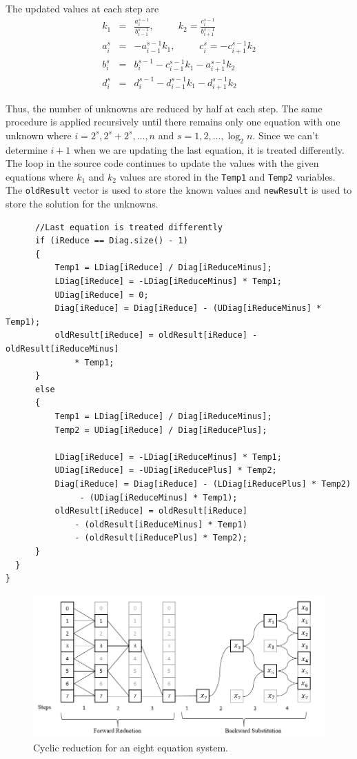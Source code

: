 \documentclass[12pt, oneside]{book}
\theoremstyle{plain}
\theoremstyle{definition}
\begin{document}
The updated values at each step are 
\begin{eqnarray}
k_1 &=& \frac{ a_{i}^{s - 1}}{b_{i-1}^{s - 1}}, \hspace{30pt} k_2 = \frac{ c_{i}^{s - 1}}{b_{i+1}^{s - 1}} \\
a_i^{s} &=& -a_{i-1}^{s - 1}  k_1, \hspace{30pt} c_i^{s} = -c_{i+1}^{s - 1}  k_2\\
b_i^{s} &=& b_{i}^{s - 1} -c_{i-1}^{s - 1} k_1 - a_{i+1}^{s - 1}  k_2  \\
d_i^{s} &=& d_i^{s - 1} - d_{i- 1}^{s - 1}  k_1 - d_{i + 1}^{s - 1}   k_2
\end{eqnarray}

Thus, the number of unknowns are reduced by half at each step. The same procedure is applied recursively until there remains only one equation with one unknown where $ i = 2^s, 2^s + 2^s, ... , n$ and $s = 1, 2, ... , \log_2 n$. Since we can't determine $i + 1$ when we are updating the last equation, it is treated differently. The loop in the source code continues to update the values with the given equations where $k_1$ and $k_2$ values are stored in the \verb!Temp1! and \verb!Temp2! variables. The \verb!oldResult! vector is used to store the known values and \verb!newResult! is used to store the solution for the unknowns.
\begin{verbatim}
      //Last equation is treated differently
      if (iReduce == Diag.size() - 1)
      {
          Temp1 = LDiag[iReduce] / Diag[iReduceMinus];
          LDiag[iReduce] = -LDiag[iReduceMinus] * Temp1;
          UDiag[iReduce] = 0;
          Diag[iReduce] = Diag[iReduce] - (UDiag[iReduceMinus] * Temp1);
          oldResult[iReduce] = oldResult[iReduce] - oldResult[iReduceMinus]
              * Temp1;
      }
      else
      {
          Temp1 = LDiag[iReduce] / Diag[iReduceMinus];
          Temp2 = UDiag[iReduce] / Diag[iReducePlus];

          LDiag[iReduce] = -LDiag[iReduceMinus] * Temp1;
          UDiag[iReduce] = -UDiag[iReducePlus] * Temp2;
          Diag[iReduce] = Diag[iReduce] - (LDiag[iReducePlus] * Temp2)
               - (UDiag[iReduceMinus] * Temp1);
          oldResult[iReduce] = oldResult[iReduce]
              - (oldResult[iReduceMinus] * Temp1)
              - (oldResult[iReducePlus] * Temp2);
      }
  }
}
\end{verbatim}
\begin{figure}[!htb]
    \centering
        \includegraphics[scale=0.7]{cyclic.png}
    \caption{Cyclic reduction for an eight equation system.}
\end{figure}
\end{document}

